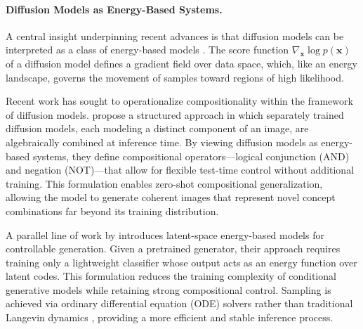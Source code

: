 \paragraph{Diffusion Models as Energy-Based Systems.}
A central insight underpinning recent advances is that diffusion models can be interpreted as a class of energy-based models \citep{du2023reduce}.  
The score function $\nabla_\mathbf{x}\log p(\mathbf{x})$ of a diffusion model defines a gradient field over data space, which, like an energy landscape, governs the movement of samples toward regions of high likelihood.  

Recent work has sought to operationalize compositionality within the framework of diffusion models.  
\citet{liu2022compositional} propose a structured approach in which separately trained diffusion models, each modeling a distinct component of an image, are algebraically combined at inference time.  
By viewing diffusion models as energy-based systems, they define compositional operators—logical conjunction (AND) and negation (NOT)—that allow for flexible test-time control without additional training.  
This formulation enables zero-shot compositional generalization, allowing the model to generate coherent images that represent novel concept combinations far beyond its training distribution.

A parallel line of work by \citet{nie2021controllable} introduces latent-space energy-based models for controllable generation.  
Given a pretrained generator, their approach requires training only a lightweight classifier whose output acts as an energy function over latent codes.  
This formulation reduces the training complexity of conditional generative models while retaining strong compositional control.  
Sampling is achieved via ordinary differential equation (ODE) solvers rather than traditional Langevin dynamics \citep{NEURIPS2019_3001ef25, vincent_score_matching_2011}, providing a more efficient and stable inference process.  

